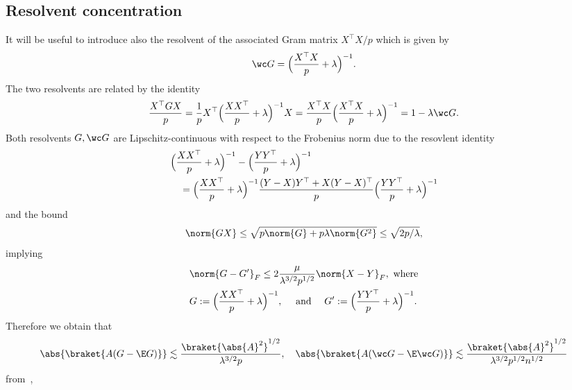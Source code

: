 \subsection*{Resolvent concentration}
It will be useful to introduce also the resolvent of the associated Gram matrix $X^\top X/p$ which is given by
\begin{equation}
    \wc G = \Bigl(\frac{X^\top X}{p}+\lambda\Bigr)^{-1}.
\end{equation}
The two resolvents are related by the identity
\begin{equation}\label{res identity XGX = 1-lambda cG}
    \frac{X^\top G X}{p} = \frac{1}{p}X^\top \Bigl( \frac{XX^\top}{p} +\lambda\Bigr)^{-1} X = \frac{X^\top X}{p} \Bigl( \frac{X^\top X}{p} +\lambda\Bigr)^{-1} = 1 - \lambda \wc G.
\end{equation}
Both resolvents $G,\wc G$ are Lipschitz-continuous with respect to the Frobenius norm due to the resovlent identity
\begin{equation}
    \begin{aligned}
        &\Bigl(\frac{XX^\top}{p}+\lambda\Bigr)^{-1} - \Bigl(\frac{YY^\top}{p} + \lambda\Bigr)^{-1} \\
        &\quad =\Bigl(\frac{XX^\top}{p}+\lambda\Bigr)^{-1} \frac{(Y-X)Y^\top +X(Y-X)^\top}{p} \Bigl(\frac{YY^\top}{p} + \lambda\Bigr)^{-1}\\
    \end{aligned}
\end{equation}
and the bound
\begin{equation}
    \norm{GX}\le \sqrt{p\norm{G}+p\lambda\norm{G^2}} \le \sqrt{2p/\lambda},
\end{equation}
implying
\begin{equation}\label{res Lipschitz}
    \begin{aligned}
    &\norm{G-G'}_F \le 2 \frac{\mu}{\lambda^{3/2}p^{1/2}}\norm{X-Y}_F, \text{ where} \\
    &G:=\Bigl(\frac{XX^\top}{p}+\lambda\Bigr)^{-1},\quad \text{ and } \quad  G':= \Bigl(\frac{YY^\top}{p} + \lambda\Bigr)^{-1}.
    \end{aligned}
\end{equation}
Therefore we obtain that
\begin{equation}\label{conc res}
    \abs{\braket{A(G-\E G)}} \lesssim \frac{\braket{\abs{A}^2}^{1/2}}{\lambda^{3/2}p}, \quad \abs{\braket{A(\wc G-\E \wc G)}} \lesssim \frac{\braket{\abs{A}^2}^{1/2}}{\lambda^{3/2}p^{1/2}n^{1/2}}
\end{equation}
from~,
